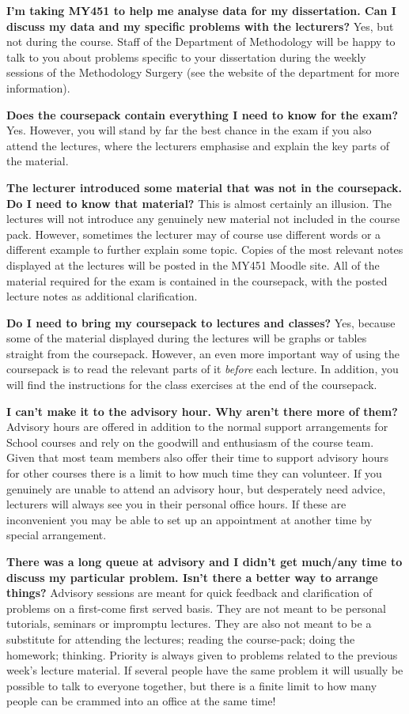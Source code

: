 \documentclass[11pt,a4paper,openany]{book}
\begin{document}
\textbf{I'm taking MY451 to help me analyse data for my dissertation.
Can I discuss my data and my specific problems with the lecturers?} Yes,
but not during the course. Staff of the Department of Methodology will
be happy to talk to you about problems specific to your dissertation
during the weekly sessions of the Methodology Surgery (see the website
of the department for more information).

\textbf{Does the coursepack contain everything I need to know for the
exam?} Yes. However, you will stand by far the best chance in the exam
if you also attend the lectures, where the lecturers emphasise and
explain the key parts of the material.

\textbf{The lecturer introduced some material that was not in the
coursepack. Do I need to know that material?} This is almost certainly
an illusion. The lectures will not introduce any genuinely new material
not included in the course pack. However, sometimes the lecturer may of
course use different words or a different example to further explain
some topic. Copies of the most relevant notes displayed at the lectures
will be posted in the MY451 Moodle site. All of the material required
for the exam is contained in the coursepack, with the posted lecture
notes as additional clarification.

\textbf{Do I need to bring my coursepack to lectures and classes?} Yes,
because some of the material displayed during the lectures will be
graphs or tables straight from the coursepack. However, an even more
important way of using the coursepack is to read the relevant parts of
it \emph{before} each lecture. In addition, you will find the
instructions for the class exercises at the end of the coursepack.

\textbf{I can't make it to the advisory hour. Why aren't there more of
them?} Advisory hours are offered in addition to the normal support
arrangements for School courses and rely on the goodwill and enthusiasm
of the course team. Given that most team members also offer their time
to support advisory hours for other courses there is a limit to how much
time they can volunteer. If you genuinely are unable to attend an
advisory hour, but desperately need advice, lecturers will always see
you in their personal office hours. If these are inconvenient you may be
able to set up an appointment at another time by special arrangement.

\newpage

\textbf{There was a long queue at advisory and I didn't get much/any
time to discuss my particular problem. Isn't there a better way to
arrange things?} Advisory sessions are meant for quick feedback and
clarification of problems on a first-come first served basis. They are
not meant to be personal tutorials, seminars or impromptu lectures. They
are also not meant to be a substitute for attending the lectures;
reading the course-pack; doing the homework; thinking. Priority is
always given to problems related to the previous week's lecture
material. If several people have the same problem it will usually be
possible to talk to everyone together, but there is a finite limit to
how many people can be crammed into an office at the same time!
\end{document}

